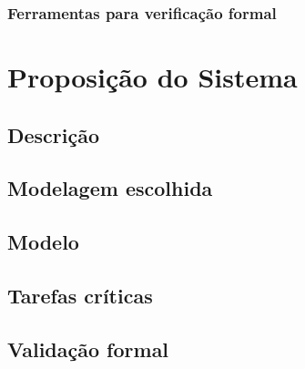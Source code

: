 \documentclass{article}
\begin{document}
		\subsubsection{Ferramentas para verificação formal}

\section{Proposição do Sistema}
	\subsection{Descrição}
	\subsection{Modelagem escolhida}
	\subsection{Modelo}
	\subsection{Tarefas críticas}
	\subsection{Validação formal}


\newpage



\end{document}
